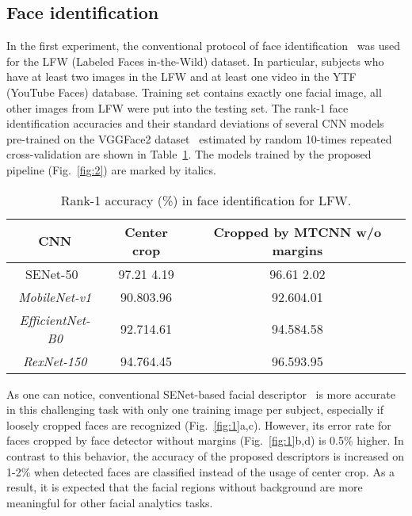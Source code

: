 \documentclass[runningheads]{llncs}
\begin{document}
\subsection{Face identification}\label{sec:4.1}

In the first experiment, the conventional protocol of face identification~\cite{savchenko2018granular} was used for the LFW (Labeled Faces in-the-Wild) dataset. In particular,  subjects who have at least two images in the LFW and at least one video in the YTF (YouTube Faces) database. Training set contains exactly one facial image, all other images from LFW were put into the testing set. The rank-1 face identification accuracies and their standard deviations of several CNN models pre-trained on the VGGFace2 dataset~\cite{cao2018vggface2} estimated by random 10-times repeated cross-validation are shown in Table~\ref{tab:lfw}. The models trained by the proposed pipeline (Fig.~\ref{fig:2}) are marked by italics. 

\begin{table}[t]
\caption{Rank-1 accuracy (\%) in face identification for LFW.}\label{tab:lfw}
\centering
\begin{tabular}{|c|c|c|}
\hline
CNN & Center crop & Cropped by MTCNN w/o margins\\
\hline
SENet-50~\cite{cao2018vggface2} & 97.21 4.19 & 96.61 2.02\\
\hline
\it MobileNet-v1 & 90.803.96 & 92.604.01\\
\it EfficientNet-B0 & 92.714.61 & 94.584.58\\
\it RexNet-150 & 94.764.45 & 96.593.95\\
\hline
\end{tabular}
\end{table}

As one can notice, conventional SENet-based facial descriptor~\cite{cao2018vggface2} is more accurate in this challenging task with only one training image per subject, especially if loosely cropped faces are recognized (Fig.~\ref{fig:1}a,c). However, its error rate for faces cropped by face detector without margins (Fig.~\ref{fig:1}b,d) is 0.5\% higher. In contrast to this behavior, the accuracy of the proposed descriptors is increased on 1-2\% when detected faces are classified instead of the usage of center crop. As a result, it is expected that the facial regions without background are more meaningful for other facial analytics tasks. 
\end{document}
